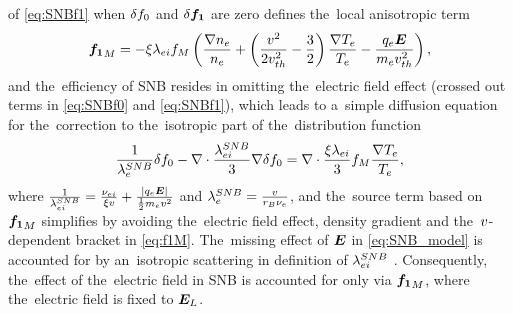 of \eqref{eq:SNBf1} when $\delta f_0$ and $\delta {\boldsymbol{f_1}}$ are zero
defines the~local anisotropic term
\begin{equation}
  {\boldsymbol{f_1}}_M = -\xi\lambda_{ei}f_M\left( \frac{\nabla n_e}{n_e} 
+ \left( \frac{v^2}{2v_{th}^2} - \frac{3}{2}\right)
\frac{\nabla T_e}{T_e} - \frac{q_e\boldsymbol{E}}{m_ev_{th}^2}\right) ,
  \label{eq:f1M}
\end{equation}
and the~efficiency of SNB resides in omitting the~electric field 
effect (crossed out terms in \eqref{eq:SNBf0} and \eqref{eq:SNBf1}), which
leads to a~simple diffusion equation for the~correction to the~isotropic 
part of the~distribution function
\begin{equation}
  \frac{1}{\lambda_e^{SNB}}\delta f_0 
  - \nabla\cdot\frac{\lambda_{ei}^{SNB}}{3}\nabla\delta f_0 =
  \nabla\cdot\frac{\xi\lambda_{ei}}{3}f_M\frac{\nabla T_e}{T_e}
  ,
  \label{eq:SNB_model}
\end{equation}
where $\frac{1}{\lambda_{ei}^{SNB}} = 
\frac{\nu_{ei}}{\xi v} + \frac{|q_e\boldsymbol{E}|}{\frac{1}{2}m_ev^2}$ 
and $\lambda_e^{SNB} = \frac{v}{r_B \nu_{e}}$, and the~source term based on 
${\boldsymbol{f_1}}_M$ simplifies by avoiding the~electric field effect, density gradient 
and the~$v$-dependent bracket in \eqref{eq:f1M}. The~missing
effect of $\boldsymbol{E}$ in \eqref{eq:SNB_model} is accounted for by 
an~isotropic scattering in definition of $\lambda_{ei}^{SNB}$ \cite{Schurtz_2000}.
Consequently, the~effect of the~electric field in SNB
is accounted for only via ${\boldsymbol{f_1}}_M$, where the~electric field is
fixed to $\boldsymbol{E}_L$. 

